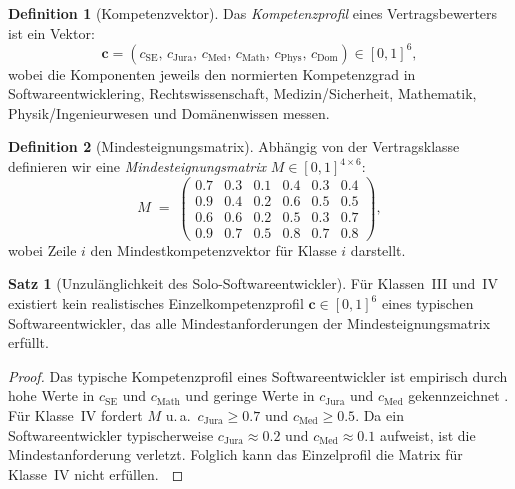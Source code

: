 ﻿\documentclass[a4paper,12pt]{article}
\theoremstyle{definition}
\newtheorem{definition}{Definition}
\newtheorem{satz}{Satz}
\newenvironment{beweis}{\begin{proof}}{\end{proof}}
\begin{document}
\begin{definition}[Kompetenzvektor]
    Das \emph{Kompetenzprofil} eines Vertragsbewerters ist ein Vektor:
    \[
        \mathbf{c} = (c_{\mathrm{SE}},\, c_{\mathrm{Jura}},\, c_{\mathrm{Med}},\,
                     c_{\mathrm{Math}},\, c_{\mathrm{Phys}},\, c_{\mathrm{Dom}}) \in [0,1]^6,
    \]
    wobei die Komponenten jeweils den normierten Kompetenzgrad in Softwareentwicklering,
    Rechtswissenschaft, Medizin/Sicherheit, Mathematik, Physik/Ingenieurwesen und
    Dom\"anenwissen messen.
\end{definition}

\begin{definition}[Mindesteignungsmatrix]
    Abh\"angig von der Vertragsklasse definieren wir eine \emph{Mindesteignungsmatrix}
    $M \in [0,1]^{4 \times 6}$:
    \[
        M \;=\;
        \begin{pmatrix}
            0.7 & 0.3 & 0.1 & 0.4 & 0.3 & 0.4 \\
            0.9 & 0.4 & 0.2 & 0.6 & 0.5 & 0.5 \\
            0.6 & 0.6 & 0.2 & 0.5 & 0.3 & 0.7 \\
            0.9 & 0.7 & 0.5 & 0.8 & 0.7 & 0.8
        \end{pmatrix},
    \]
    wobei Zeile $i$ den Mindestkompetenzvektor f\"ur Klasse $i$ darstellt.
\end{definition}

\begin{satz}[Unzul\"anglichkeit des Solo-Softwareentwickler]
\label{satz:solo}
    F\"ur Klassen~III und~IV existiert kein realistisches Einzelkompetenzprofil
    $\mathbf{c} \in [0,1]^6$ eines typischen Softwareentwickler, das alle
    Mindestanforderungen der Mindesteignungsmatrix erf\"ullt.
\end{satz}

\begin{beweis}
    Das typische Kompetenzprofil eines Softwareentwickler ist empirisch durch hohe Werte
    in $c_{\mathrm{SE}}$ und $c_{\mathrm{Math}}$ und geringe Werte in $c_{\mathrm{Jura}}$
    und $c_{\mathrm{Med}}$ gekennzeichnet \cite{ieee2014}. F\"ur Klasse~IV fordert $M$
    u.\,a.\ $c_{\mathrm{Jura}} \geq 0.7$ und $c_{\mathrm{Med}} \geq 0.5$.
    Da ein Softwareentwickler typischerweise $c_{\mathrm{Jura}} \approx 0.2$ und
    $c_{\mathrm{Med}} \approx 0.1$ aufweist, ist die Mindestanforderung verletzt.
    Folglich kann das Einzelprofil die Matrix f\"ur Klasse~IV nicht erf\"ullen.
    $\qedhere$
\end{beweis}
\end{document}
